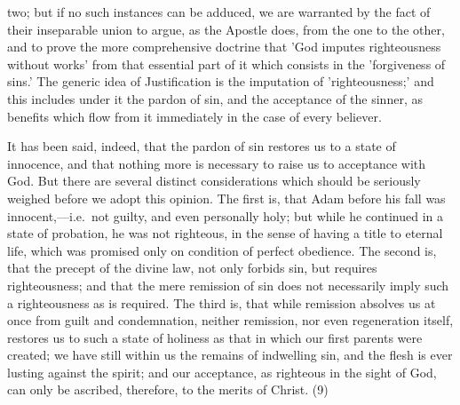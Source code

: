 \documentclass[
]{book}
\begin{document}
two; but if no such instances can be adduced, we are warranted by the fact of their inseparable union to argue, as the Apostle does, from the one to the other, and to prove the more comprehensive doctrine that 'God imputes righteousness without works' from that essential part of it which consists in the 'forgiveness of sins.' The generic idea of Justification is the imputation of 'righteousness;' and this includes under it the pardon of sin, and the acceptance of the sinner, as benefits which flow from it immediately in the case of every believer.

It has been said, indeed, that the pardon of sin restores us to a state of innocence, and that nothing more is necessary to raise us to acceptance with God. But there are several distinct considerations which should be seriously weighed before we adopt this opinion. The first is, that Adam before his fall was innocent,---i.e.~not guilty, and even personally holy; but while he continued in a state of probation, he was not righteous, in the sense of having a title to eternal life, which was promised only on condition of perfect obedience. The second is, that the precept of the divine law, not only forbids sin, but requires righteousness; and that the mere remission of sin does not necessarily imply such a righteousness as is required. The third is, that while remission absolves us at once from guilt and condemnation, neither remission, nor even regeneration itself, restores us to such a state of holiness as that in which our first parents were created; we have still within us the remains of indwelling sin, and the flesh is ever lusting against the spirit; and our acceptance, as righteous in the sight of God, can only be ascribed, therefore, to the merits of Christ. (9)
\end{document}
